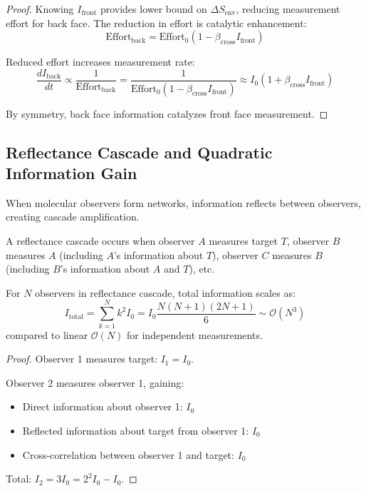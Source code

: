 \begin{theorem}
\begin{proof}
Knowing $I_{\text{front}}$ provides lower bound on $\Delta S_{\text{env}}$, reducing measurement effort for back face. The reduction in effort is catalytic enhancement:
\begin{equation}
\text{Effort}_{\text{back}} = \text{Effort}_0 (1 - \beta_{\text{cross}} I_{\text{front}})
\end{equation}

Reduced effort increases measurement rate:
\begin{equation}
\frac{dI_{\text{back}}}{dt} \propto \frac{1}{\text{Effort}_{\text{back}}} = \frac{1}{\text{Effort}_0(1 - \beta_{\text{cross}} I_{\text{front}})} \approx I_0(1 + \beta_{\text{cross}} I_{\text{front}})
\end{equation}

By symmetry, back face information catalyzes front face measurement.
\end{proof}

\subsection{Reflectance Cascade and Quadratic Information Gain}

When molecular observers form networks, information reflects between observers, creating cascade amplification.

\begin{definition}
\label{def:reflectance_cascade}
A reflectance cascade occurs when observer $A$ measures target $T$, observer $B$ measures $A$ (including $A$'s information about $T$), observer $C$ measures $B$ (including $B$'s information about $A$ and $T$), etc.
\end{definition}

\begin{theorem}
\label{thm:cascade_scaling}
For $N$ observers in reflectance cascade, total information scales as:
\begin{equation}
I_{\text{total}} = \sum_{k=1}^{N} k^2 I_0 = I_0 \frac{N(N+1)(2N+1)}{6} \sim \mathcal{O}(N^3)
\end{equation}
compared to linear $\mathcal{O}(N)$ for independent measurements.
\end{theorem}

\begin{proof}
Observer 1 measures target: $I_1 = I_0$.

Observer 2 measures observer 1, gaining:
\begin{itemize}
\item Direct information about observer 1: $I_0$
\item Reflected information about target from observer 1: $I_0$
\item Cross-correlation between observer 1 and target: $I_0$
\end{itemize}
Total: $I_2 = 3I_0 = 2^2 I_0 - I_0$.


\end{proof}
\end{theorem}
